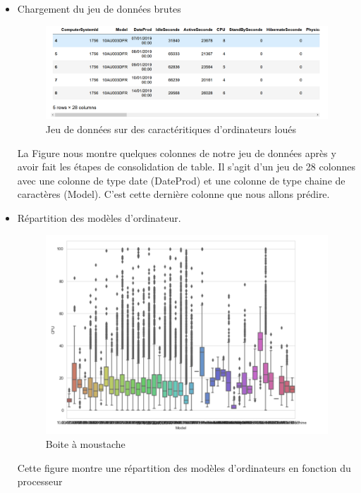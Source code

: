 \begin{itemize}[label=\textbullet, font=\LARGE \color{black}]
\item Chargement du jeu de données brutes
\begin{figure}[h]
\begin{center}
\includegraphics[scale=0.50]{Donnes_brutes.png}
\caption[Jeu de données sur des caractéritiques d'ordinateurs loués]{Jeu de données sur des caractéritiques d'ordinateurs loués}
\label{monlabel}
\end{center}
\end{figure}
\newline
La Figure nous montre quelques colonnes de notre jeu de données après y avoir fait les étapes de consolidation de table. Il s'agit d'un jeu de 28 colonnes avec une colonne de type date (DateProd) et une colonne de type chaine de caractères (Model). C'est cette dernière colonne que nous  allons prédire.

\newpage
\item Répartition des modèles d'ordinateur.
\newline
\begin{figure}[h]
\begin{center}
\includegraphics[scale=0.90]{Box_plot_repartition.png}
\caption[Boite à moustache]{Boite à moustache}
\label{monlabel}
\end{center}
\end{figure}
\newline
Cette figure montre une répartition des modèles d'ordinateurs en fonction du processeur


\end{itemize}
